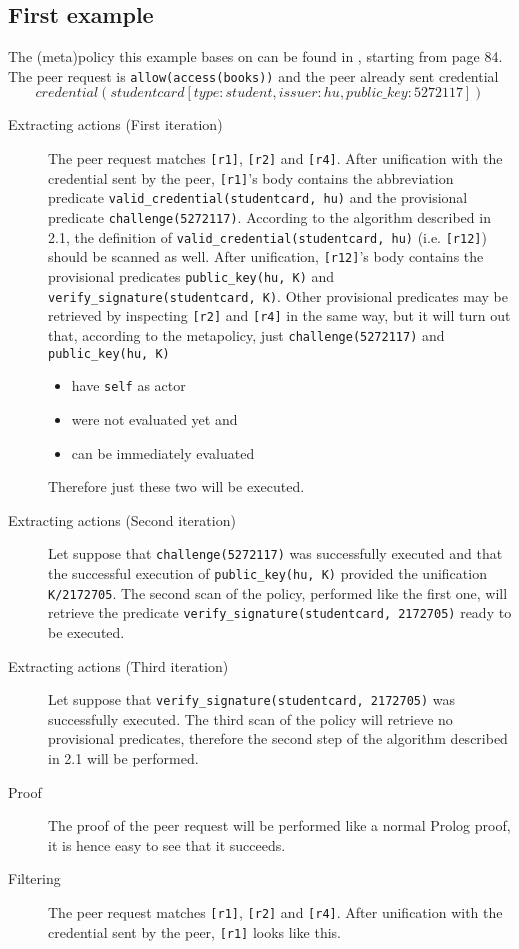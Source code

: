 \documentclass{article}
\begin{document}
\subsection{First example}

The (meta)policy this example bases on can be found in \cite{Denisa}, starting from page 84. The peer request is \texttt{allow(access(books))} and the peer already sent credential $$credential(studentcard[type:student, issuer:hu, public\_key: 5272117])$$

\begin{description}
\item[Extracting actions (First iteration)]
The peer request matches \texttt{[r1]}, \texttt{[r2]} and \texttt{[r4]}. After unification with the credential sent by the peer, \texttt{[r1]}'s body contains the abbreviation predicate \texttt{valid\_credential(studentcard, hu)} and the provisional predicate \texttt{challenge(5272117)}. According to the algorithm described in 2.1, the definition of \texttt{valid\_credential(studentcard, hu)} (i.e. \texttt{[r12]}) should be scanned as well. After unification, \texttt{[r12]}'s body contains the provisional predicates \texttt{public\_key(hu, K)} and \texttt{verify\_signature(studentcard, K)}. Other provisional predicates may be retrieved by inspecting \texttt{[r2]} and \texttt{[r4]} in the same way, but it will turn out that, according to the metapolicy, just \texttt{challenge(5272117)} and \texttt{public\_key(hu, K)}

\begin{itemize}
	\item have \texttt{self} as actor
	\item were not evaluated yet and
	\item can be immediately evaluated
\end{itemize}

Therefore just these two will be executed.
\item[Extracting actions (Second iteration)]
Let suppose that \texttt{challenge(5272117)} was successfully executed and that the successful execution of \texttt{public\_key(hu, K)} provided the unification \texttt{K/2172705}. The second scan of the policy, performed like the first one, will retrieve the predicate \texttt{verify\_signature(studentcard, 2172705)} ready to be executed.
\item[Extracting actions (Third iteration)]
Let suppose that \texttt{verify\_signature(studentcard, 2172705)} was successfully executed. The third scan of the policy will retrieve no provisional predicates, therefore the second step of the algorithm described in 2.1 will be performed.
\item[Proof]
The proof of the peer request will be performed like a normal Prolog proof, it is hence easy to see that it succeeds.
\item[Filtering]
The peer request matches \texttt{[r1]}, \texttt{[r2]} and \texttt{[r4]}. After unification with the credential sent by the peer, \texttt{[r1]} looks like this.


\end{description}
\end{document}
